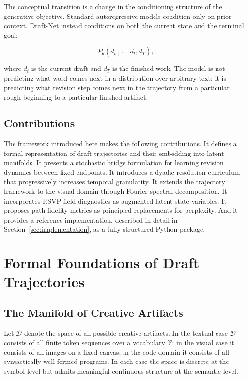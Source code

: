 \documentclass[12pt,a4paper]{article}
\theoremstyle{draftthm}
\newcommand{\D}{\mathcal{D}}
\begin{document}
The conceptual transition is a change in the conditioning structure of the generative objective. Standard autoregressive models condition only on prior context. Draft-Net instead conditions on both the current state and the terminal goal:

\begin{equation}
  P_{\theta}(d_{t+1} \mid d_t, d_T),
\end{equation}

where $d_t$ is the current draft and $d_T$ is the finished work. The model is not predicting what word comes next in a distribution over arbitrary text; it is predicting what revision step comes next in the trajectory from a particular rough beginning to a particular finished artifact.

\subsection{Contributions}

The framework introduced here makes the following contributions. It defines a formal representation of draft trajectories and their embedding into latent manifolds. It presents a stochastic bridge formulation for learning revision dynamics between fixed endpoints. It introduces a dyadic resolution curriculum that progressively increases temporal granularity. It extends the trajectory framework to the visual domain through Fourier spectral decomposition. It incorporates RSVP field diagnostics as augmented latent state variables. It proposes path-fidelity metrics as principled replacements for perplexity. And it provides a reference implementation, described in detail in Section~\ref{sec:implementation}, as a fully structured Python package.

\section{Formal Foundations of Draft Trajectories}

\subsection{The Manifold of Creative Artifacts}

Let $\D$ denote the space of all possible creative artifacts. In the textual case $\D$ consists of all finite token sequences over a vocabulary $\mathcal{V}$; in the visual case it consists of all images on a fixed canvas; in the code domain it consists of all syntactically well-formed programs. In each case the space is discrete at the symbol level but admits meaningful continuous structure at the semantic level.
\end{document}
